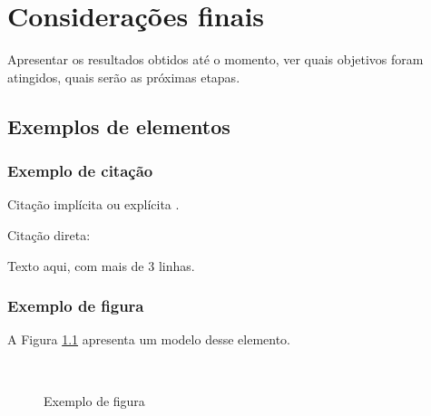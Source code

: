 \chapter{Considerações finais}\label{chap:consideracoes}

Apresentar os resultados obtidos até o momento, ver quais objetivos foram atingidos, quais serão as próximas etapas.

\section{Exemplos de elementos}

\subsection{Exemplo de citação}

Citação implícita \cite{mittelbach2004latex} ou explícita .

Citação direta:

\begin{citacao}
Texto aqui, com mais de 3 linhas. \cite[pp. 10]{mittelbach2004latex}
\end{citacao}

\subsection{Exemplo de figura}

A Figura \ref{fig:exemplo} apresenta um modelo desse elemento.

\begin{center}
\begin{figure}[H]
	\vspace*{0,1cm}
	\centering
	\caption{Exemplo de figura}
    \label{fig:exemplo}
    {}\\
\end{figure}
\end{center}


